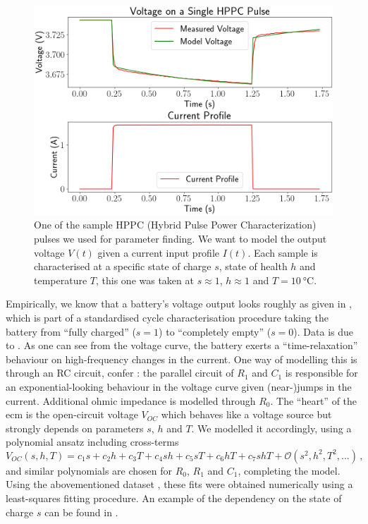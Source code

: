 \documentclass{prettytex/ox/mmsc-special-topic}
\begin{document}
  \begin{figure}[H]
    \centering
    \includegraphics[width=0.6\linewidth]{figures/hppc-pulse.png}
    \caption{One of the sample HPPC (Hybrid Pulse Power Characterization) pulses we used for parameter finding. We want to model the output voltage $V(t)$ given a current input profile $I(t)$. Each sample is characterised at a specific state of charge $s$, state of health $h$ and temperature $T$, this one was taken at $s \approx 1$, $h \approx 1$ and $T = \SI{10}{\degreeCelsius}$.}
    \label{fig:hppc-pulse}
  \end{figure}

  Empirically, we know that a battery's voltage output looks roughly as given in , which is part of a standardised cycle characterisation procedure taking the battery from ``fully charged'' ($s=1$) to ``completely empty'' ($s=0$). Data is due to \cite{panasonicnums}.
  As one can see from the voltage curve, the battery exerts a ``time-relaxation'' behaviour on high-frequency changes in the current.
  One way of modelling this is through an RC circuit, confer : the parallel circuit of $R_1$ and $C_1$ is responsible for an exponential-looking behaviour in the voltage curve given (near-)jumps in the current.
  Additional ohmic impedance is modelled through $R_0$.
  The ``heart'' of the \gls{ecm} is the open-circuit voltage $V_{OC}$ which behaves like a voltage source but strongly depends on parameters $s$, $h$ and $T$.
  We modelled it accordingly, using a polynomial ansatz including cross-terms $$V_{OC}(s, h, T) = c_1 s + c_2 h + c_3 T + c_4 sh + c_5 sT + c_6 hT + c_7 shT + \mathcal{O}(s^2, h^2, T^2, ...)\,,$$
  and similar polynomials are chosen for $R_0$, $R_1$ and $C_1$, completing the model.
  Using the abovementioned dataset \parencite{panasonicnums}, these fits were obtained numerically using a least-squares fitting procedure. An example of the dependency on the state of charge $s$ can be found in .
\end{document}
